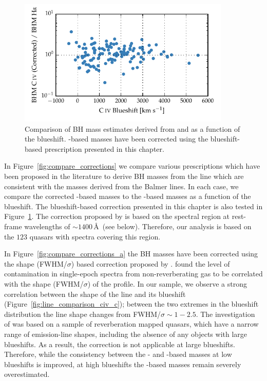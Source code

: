 \begin{figure}
    \centering 
    \includegraphics[width=0.9\textwidth]{figures/chapter03/corrections_coatman.pdf} 
    \caption[{Comparison of corrected -based BH masses and \hans-based masses as a function of the  blueshift.}]{Comparison of BH mass estimates derived from  and \ha as a function of the  blueshift. -based masses have been corrected using the  blueshift-based prescription presented in this chapter.}
    \label{fig:compare_corrections_coatman}
\end{figure}

In Figure~\ref{fig:compare_corrections} we compare various prescriptions which have been proposed in the literature to derive BH masses from the  line which are consistent with the masses derived from the Balmer lines. 
In each case, we compare the corrected -based masses to the \hans-based masses as a function of the  blueshift. 
The  blueshift-based correction presented in this chapter is also tested in Figure~\ref{fig:compare_corrections_coatman}.
The correction proposed by \citet{runnoe13} is based on the spectral region at rest-frame wavelengths of $\sim$$1400$\,\AA\, (see below). 
Therefore, our analysis is based on the $123$ quasars with spectra covering this region. 

In Figure~\ref{fig:compare_corrections_a} the  BH masses have been corrected using the  shape (FWHM/$\sigma$) based correction proposed by \citet{denney12}. 
\citet{denney12} found the level of contamination in single-epoch spectra from non-reverberating gas to be correlated with the shape (FWHM/$\sigma$) of the  profile. 
In our sample, we observe a strong correlation between the shape of the  line and its blueshift (Figure~\ref{fig:line_comparison_civ_c}); between the two extremes in the  blueshift distribution the line shape changes from FWHM/$\sigma\sim1-2.5$. 
The investigation of \citet{denney12} was based on a sample of reverberation mapped quasars, which have a narrow range of  emission-line shapes, including the absence of any objects with large  blueshifts. 
As a result, the correction is not applicable at large  blueshifts. 
Therefore, while the consistency between the \hans- and -based masses at low  blueshifts is improved, at high  blueshifts the -based masses remain severely overestimated.

